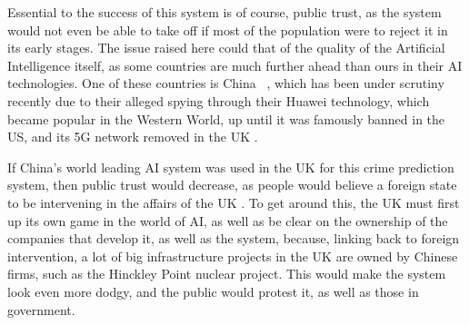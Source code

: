 Essential to the success of this system is of course, public trust, as the system would not even be able to take off
if most of the population were to reject it in its early stages.
The issue raised here could that of the quality of the Artificial Intelligence itself, as some countries are much
further ahead than ours in their AI technologies.
One of these countries is China ~\cite{ai-arms-race}, which has been under scrutiny recently due to their alleged
spying through their Huawei technology, which became popular in the Western World, up until it was famously banned in
the US, and its 5G network removed in the UK .

If China's world leading AI system was used in the UK for this crime prediction system, then public trust would
decrease, as people would believe a foreign state to be intervening in the affairs of the UK .
To get around this, the UK must first up its own game in the world of AI, as well as be clear on the ownership of the
companies that develop it, as well as the system, because, linking back to foreign intervention, a lot of big
infrastructure projects in the UK are owned by Chinese firms, such as the Hinckley Point nuclear project\cite{hinkley}.
This would make the system look even more dodgy, and the public would protest it, as well as those in government.